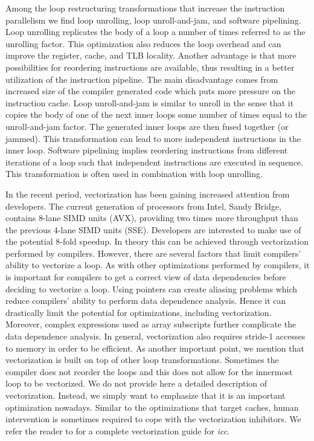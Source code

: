 Among the loop restructuring transformations that increase the instruction parallelism we find loop unrolling, loop unroll-and-jam, and software pipelining. Loop unrolling replicates the body of a loop a number of times referred to as the unrolling factor. This optimization also reduces the loop overhead and can improve the register, cache, and TLB locality. Another advantage is that more possibilities for reordering instructions are available, thus resulting in a better utilization of the instruction pipeline. The main disadvantage comes from increased size of the compiler generated code which puts more pressure on the instruction cache. Loop unroll-and-jam is similar to unroll in the sense that it copies the body of one of the next inner loops some number of times equal to the unroll-and-jam factor. The generated inner loops are then fused together (or jammed). This transformation can lead to more independent instructions in the inner loop. Software pipelining implies reordering instructions from different iterations of a loop such that independent instructions are executed in sequence. This transformation is often used in combination with loop unrolling.

In the recent period, vectorization has been gaining increased attention from developers. The current generation of processors from Intel, Sandy Bridge, contains 8-lane SIMD units (AVX), providing two times more throughput than the previous 4-lane SIMD units (SSE). Developers are interested to make use of the potential 8-fold speedup. In theory this can be achieved through vectorization performed by compilers. However, there are several factors that limit compilers' ability to vectorize a loop. As with other optimizations performed by compilers, it is important for compilers to get a correct view of data dependencies before deciding to vectorize a loop. Using pointers can create aliasing problems which reduce compilers' ability to perform data dependence analysis. Hence it can drastically limit the potential for optimizations, including vectorization. Moreover, complex expressions used as array subscripts further complicate the data dependence analysis. In general, vectorization also requires stride-1 accesses to memory in order to be efficient. As another important point, we mention that vectorization is built on top of other loop transformations. Sometimes the compiler does not reorder the loops and this does not allow for the innermost loop to be vectorized. 
We do not provide here a detailed description of vectorization. Instead, we simply want to emphasize that it is an important optimization nowadays. Similar to the optimizations that target caches, human intervention is sometimes required to cope with the vectorization inhibitors. We refer the reader to \cite{vec_guide} for a complete vectorization guide for \textit{icc}. 

